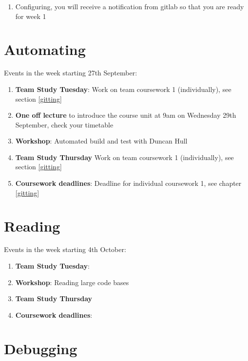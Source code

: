 \documentclass[
]{book}
\providecommand{\tightlist}{%
  \setlength{\itemsep}{0pt}\setlength{\parskip}{0pt}}
\begin{document}
\begin{enumerate}
\def\labelenumi{\arabic{enumi}.}
\tightlist
\item
  Configuring, you will receive a notification from gitlab so that you are ready for week 1
\end{enumerate}

\hypertarget{week1}{%
\section{Automating}\label{week1}}

Events in the week starting 27th September:

\begin{enumerate}
\def\labelenumi{\arabic{enumi}.}
\tightlist
\item
  \textbf{Team Study Tuesday}: Work on team coursework 1 (individually), see section \ref{gitting}
\item
  \textbf{One off lecture} to introduce the course unit at 9am on Wednesday 29th September, check your timetable
\item
  \textbf{Workshop}: Automated build and test with Duncan Hull
\item
  \textbf{Team Study Thursday} Work on team coursework 1 (individually), see section \ref{gitting}
\item
  \textbf{Coursework deadlines}: Deadline for individual coursework 1, see chapter \ref{gitting}
\end{enumerate}

\hypertarget{week2}{%
\section{Reading}\label{week2}}

Events in the week starting 4th October:

\begin{enumerate}
\def\labelenumi{\arabic{enumi}.}
\tightlist
\item
  \textbf{Team Study Tuesday}:
\item
  \textbf{Workshop}: Reading large code bases
\item
  \textbf{Team Study Thursday}
\item
  \textbf{Coursework deadlines}:
\end{enumerate}

\hypertarget{week3}{%
\section{Debugging}\label{week3}}
\end{document}
